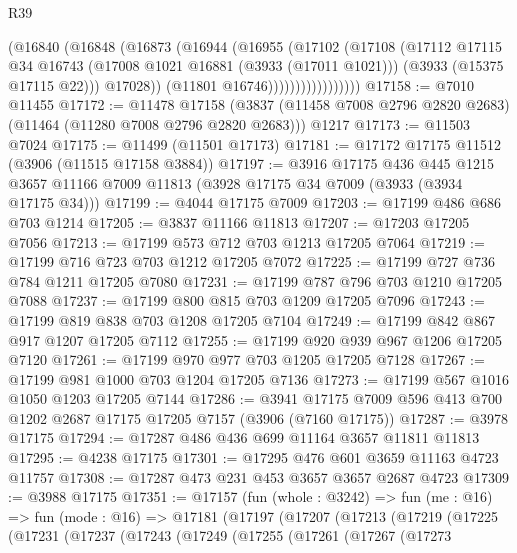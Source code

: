 \begin{lexlean}{R39}
\begin{coremodule}
                          (@16840
                            (@16848
                              (@16873
                                (@16944
                                  (@16955
                                    (@17102
                                      (@17108
                                        (@17112
                                          @17115
                                          @34
                                          @16743
                                          (@17008 @1021 @16881 (@3933 (@17011 @1021)))
                                          (@3933 (@15375 @17115 @22)))
                                        @17028))
                                    (@11801 @16746)))))))))))))))))
@17158 := @7010 @11455
@17172 := @11478
    @17158
    (@3837 (@11458 @7008 @2796 @2820 @2683) (@11464 (@11280 @7008 @2796 @2820 @2683)))
    @1217
@17173 := @11503 @7024
@17175 := @11499 (@11501 @17173)
@17181 := @17172 @17175 @11512 (@3906 (@11515 @17158 @3884))
@17197 := @3916
    @17175
    @436
    @445
    @1215
    @3657
    @11166
    @7009
    @11813
    (@3928 @17175 @34 @7009 (@3933 (@3934 @17175 @34)))
@17199 := @4044 @17175 @7009
@17203 := @17199 @486 @686 @703 @1214
@17205 := @3837 @11166 @11813
@17207 := @17203 @17205 @7056
@17213 := @17199 @573 @712 @703 @1213 @17205 @7064
@17219 := @17199 @716 @723 @703 @1212 @17205 @7072
@17225 := @17199 @727 @736 @784 @1211 @17205 @7080
@17231 := @17199 @787 @796 @703 @1210 @17205 @7088
@17237 := @17199 @800 @815 @703 @1209 @17205 @7096
@17243 := @17199 @819 @838 @703 @1208 @17205 @7104
@17249 := @17199 @842 @867 @917 @1207 @17205 @7112
@17255 := @17199 @920 @939 @967 @1206 @17205 @7120
@17261 := @17199 @970 @977 @703 @1205 @17205 @7128
@17267 := @17199 @981 @1000 @703 @1204 @17205 @7136
@17273 := @17199 @567 @1016 @1050 @1203 @17205 @7144
@17286 := @3941 @17175 @7009 @596 @413 @700 @1202 @2687 @17175 @17205 @7157 (@3906 (@7160 @17175))
@17287 := @3978 @17175
@17294 := @17287 @486 @436 @699 @11164 @3657 @11811 @11813
@17295 := @4238 @17175
@17301 := @17295 @476 @601 @3659 @11163 @4723 @11757
@17308 := @17287 @473 @231 @453 @3657 @3657 @2687 @4723
@17309 := @3988 @17175
@17351 := @17157
    (fun (whole : @3242) =>
    fun (me : @16) =>
    fun (mode : @16) =>
    @17181
      (@17197
        (@17207
          (@17213
            (@17219
              (@17225
                (@17231
                  (@17237
                    (@17243
                      (@17249
                        (@17255
                          (@17261
                            (@17267
                              (@17273

\end{coremodule}
\end{lexlean}
